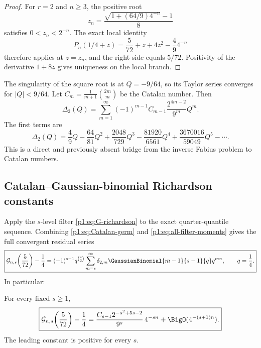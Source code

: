 \documentclass[11pt,oneside]{article}
\numberwithin{equation}{section}
\theoremstyle{definition}
\theoremstyle{remark}
\begin{document}
\begin{proof}
For $r=2$ and $n\ge3$, the positive root
\[
 z_n=\frac{\sqrt{1+(64/9)4^{-n}}-1}{8}
\]
satisfies $0<z_n<2^{-n}$.  The exact local identity
\[
 P_n(1/4+z)=\frac5{72}+z+4z^2-\frac49 4^{-n}
\]
therefore applies at $z=z_n$, and the right side equals $5/72$.  Positivity of
the derivative $1+8z$ gives uniqueness on the local branch.
\end{proof}

The singularity of the square root is at $Q=-9/64$, so its Taylor series converges
for $|Q|<9/64$.  Let $C_m=\frac1{m+1}\binom{2m}{m}$ be the Catalan number.
Then
\begin{equation}
 \boxed{
 \Delta_2(Q)=\sum_{m=1}^{\infty}
 (-1)^{m-1}C_{m-1}\frac{2^{4m-2}}{9^m}Q^m.}
 \label{p1:eq:Catalan-germ}
\end{equation}
The first terms are
\begin{equation}
 \Delta_2(Q)=\frac49Q-\frac{64}{81}Q^2
 +\frac{2048}{729}Q^3-\frac{81920}{6561}Q^4
 +\frac{3670016}{59049}Q^5-\cdots.
 \label{p1:eq:Catalan-first}
\end{equation}
This is a direct and previously absent bridge from the inverse Fabius problem to Catalan
numbers.

\subsection{Catalan--Gaussian-binomial Richardson constants}

Apply the $s$-level filter \eqref{p1:eq:G-richardson} to the exact quarter-quantile
sequence.  Combining \eqref{p1:eq:Catalan-germ} and
\eqref{p1:eq:all-filter-moments} gives the full convergent residual series
\begin{equation}
 \boxed{
 \mathcal G_{n,s}\!\left(\frac5{72}\right)-\frac14
 =(-1)^{s-1}q^{\binom s2}
 \sum_{m=s}^{\infty}
 \delta_{2,m}\GaussianBinomial{m-1}{s-1}{q}q^{mn},
 \qquad q=\frac14.}
 \label{p1:eq:Catalan-qbinom-full}
\end{equation}
In particular:

\begin{corollary}
\label{p1:cor:Catalan-Richardson}
For every fixed $s\ge1$,
\begin{equation}
 \boxed{
 \mathcal G_{n,s}\!\left(\frac5{72}\right)-\frac14
 =\frac{C_{s-1}2^{-s^2+5s-2}}{9^s}\,4^{-sn}
 +\BigO(4^{-(s+1)n}).}
 \label{p1:eq:Catalan-Richardson}
\end{equation}
The leading constant is positive for every $s$.
\end{corollary}
\end{document}
